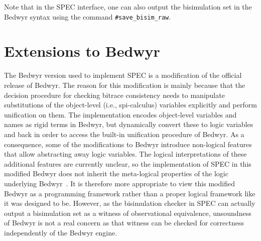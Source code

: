 \documentclass{article}
\newcommand\obj[1]{\texttt{#1}}
\begin{document}
Note that in the SPEC interface, one can also output the bisimulation set
in the Bedwyr syntax using the command \obj{\#save\_bisim\_raw}.

\section{Extensions to Bedwyr}
\label{sec:bedwyr-ext}


The Bedwyr version used to implement SPEC is a modification of
the official release of Bedwyr. The reason for this modification
is mainly because that the decision procedure for checking bitrace consistency
needs to manipulate substitutions of the object-level (i.e., spi-calculus) variables explicitly
and perform unification on them. The implementation encodes object-level
variables and names as rigid terms in Bedwyr, but dynamically convert these to
logic variables and back in order to access the built-in unification procedure
of Bedwyr. As a consequence, some of the modifications to Bedwyr introduce
non-logical features that allow abstracting away logic variables. 
The logical interpretations of these additional features are
currently unclear, so the implementation of SPEC in this modified Bedwyr
does not inherit the meta-logical properties of the logic underlying
Bedwyr~\cite{baelde07cade}. It is therefore more appropriate to view this modified
Bedwyr as a programming framework rather than a proper logical framework
like it was designed to be. However, as the bisimulation checker in SPEC can actually
output a bisimulation set as a witness of observational equivalence, unsoundness
of Bedwyr is not a real concern as that witness can be checked for correctness independently
of the Bedwyr engine. 
\end{document}
